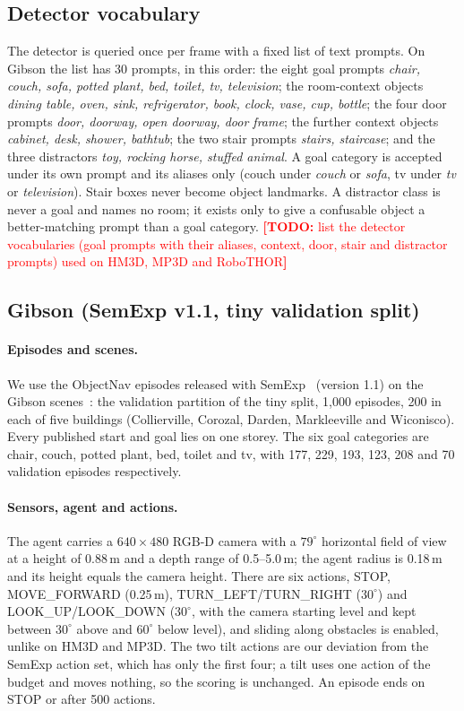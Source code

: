 \documentclass[10pt]{article}
\newcommand{\TODO}[1]{\textcolor{red}{\textbf{[TODO:} #1\textbf{]}}}
\begin{document}
\subsection{Detector vocabulary}\label{app:protocols-vocab}

The detector is queried once per frame with a fixed list of text prompts. On Gibson the list has 30 prompts, in this order: the eight goal prompts \emph{chair, couch, sofa, potted plant, bed, toilet, tv, television}; the room-context objects \emph{dining table, oven, sink, refrigerator, book, clock, vase, cup, bottle}; the four door prompts \emph{door, doorway, open doorway, door frame}; the further context objects \emph{cabinet, desk, shower, bathtub}; the two stair prompts \emph{stairs, staircase}; and the three distractors \emph{toy, rocking horse, stuffed animal}. A goal category is accepted under its own prompt and its aliases only (couch under \emph{couch} or \emph{sofa}, tv under \emph{tv} or \emph{television}). Stair boxes never become object landmarks. A distractor class is never a goal and names no room; it exists only to give a confusable object a better-matching prompt than a goal category. \TODO{list the detector vocabularies (goal prompts with their aliases, context, door, stair and distractor prompts) used on HM3D, MP3D and RoboTHOR}

\subsection{Gibson (SemExp v1.1, tiny validation split)}\label{app:protocols-gibson}

\paragraph{Episodes and scenes.} We use the ObjectNav episodes released with SemExp~\citep{chaplot2020object} (version 1.1) on the Gibson scenes~\citep{xia2018gibson}: the validation partition of the tiny split, 1{,}000 episodes, 200 in each of five buildings (Collierville, Corozal, Darden, Markleeville and Wiconisco). Every published start and goal lies on one storey. The six goal categories are chair, couch, potted plant, bed, toilet and tv, with 177, 229, 193, 123, 208 and 70 validation episodes respectively.

\paragraph{Sensors, agent and actions.} The agent carries a $640 \times 480$ RGB-D camera with a $79^\circ$ horizontal field of view at a height of 0.88\,m and a depth range of 0.5--5.0\,m; the agent radius is 0.18\,m and its height equals the camera height. There are six actions, STOP, MOVE\_FORWARD (0.25\,m), TURN\_LEFT/TURN\_RIGHT ($30^\circ$) and LOOK\_UP/LOOK\_DOWN ($30^\circ$, with the camera starting level and kept between $30^\circ$ above and $60^\circ$ below level), and sliding along obstacles is enabled, unlike on HM3D and MP3D. The two tilt actions are our deviation from the SemExp action set, which has only the first four; a tilt uses one action of the budget and moves nothing, so the scoring is unchanged. An episode ends on STOP or after 500 actions.
\end{document}
